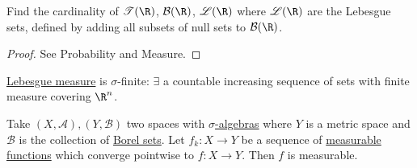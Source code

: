 \documentclass[twoside]{article}
\begin{document}
\begin{ex}
    Find the cardinality of $\mathscr{T}(\R)$, $\mathcal{B}(\R)$, $\mathscr{L}(\R)$ where $\mathscr{L}(\R)$ are the Lebesgue sets, defined by adding all subsets of null sets to $\mathcal{B}(\R)$.
\end{ex}

\begin{proof}
    See Probability and Measure.
\end{proof}

\begin{remark}
    \hyperlink{def:lebMeas}{Lebesgue measure} is \hypertarget{def:sigFinite}{$\sigma$-finite}: $\exists$ a countable increasing sequence of sets with finite measure covering $\R^n$.
\end{remark}


\begin{prop}
    Take $(X, \mathscr{A}), (Y, \mathscr{B})$ two spaces with \hyperlink{def:sigAlg}{$\sigma$-algebras} where $Y$ is a metric space and $\mathscr{B}$ is the collection of \hyperlink{def:borelSet}{Borel sets}.
    Let $f_k: X \to Y$ be a sequence of \hyperlink{def:measFunc}{measurable functions} which converge pointwise to $f:X \to Y$.
    Then $f$ is measurable.
\end{prop}
\end{document}
